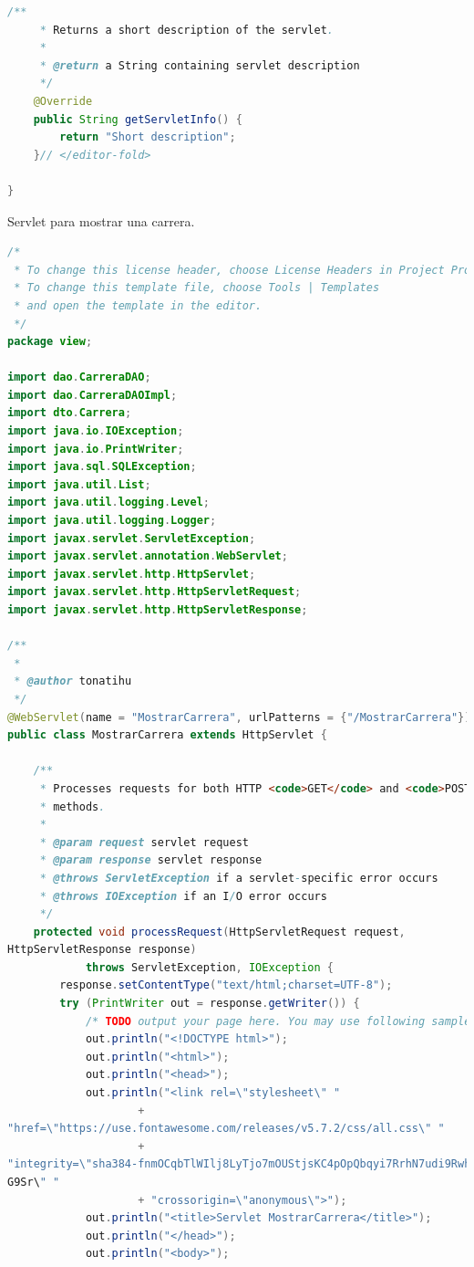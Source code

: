 \documentclass[a4paper,12pt]{article}
\begin{document}
\begin{lstlisting}[language=Java, style=customJava, 
caption={VerCarrera.java},captionpos=b,basicstyle=\fontfamily{cmss}\small]
    /**
     * Returns a short description of the servlet.
     *
     * @return a String containing servlet description
     */
    @Override
    public String getServletInfo() {
        return "Short description";
    }// </editor-fold>

}

\end{lstlisting}

Servlet para mostrar una carrera.

\begin{lstlisting}[language=Java, style=customJava, 
caption={MostrarCarrera.java},captionpos=b,basicstyle=\fontfamily{cmss}\small]
/*
 * To change this license header, choose License Headers in Project Properties.
 * To change this template file, choose Tools | Templates
 * and open the template in the editor.
 */
package view;

import dao.CarreraDAO;
import dao.CarreraDAOImpl;
import dto.Carrera;
import java.io.IOException;
import java.io.PrintWriter;
import java.sql.SQLException;
import java.util.List;
import java.util.logging.Level;
import java.util.logging.Logger;
import javax.servlet.ServletException;
import javax.servlet.annotation.WebServlet;
import javax.servlet.http.HttpServlet;
import javax.servlet.http.HttpServletRequest;
import javax.servlet.http.HttpServletResponse;

/**
 *
 * @author tonatihu
 */
@WebServlet(name = "MostrarCarrera", urlPatterns = {"/MostrarCarrera"})
public class MostrarCarrera extends HttpServlet {

    /**
     * Processes requests for both HTTP <code>GET</code> and <code>POST</code>
     * methods.
     *
     * @param request servlet request
     * @param response servlet response
     * @throws ServletException if a servlet-specific error occurs
     * @throws IOException if an I/O error occurs
     */
    protected void processRequest(HttpServletRequest request, 
HttpServletResponse response)
            throws ServletException, IOException {
        response.setContentType("text/html;charset=UTF-8");
        try (PrintWriter out = response.getWriter()) {
            /* TODO output your page here. You may use following sample code. */
            out.println("<!DOCTYPE html>");
            out.println("<html>");
            out.println("<head>");
            out.println("<link rel=\"stylesheet\" "
                    + 
"href=\"https://use.fontawesome.com/releases/v5.7.2/css/all.css\" "
                    + 
"integrity=\"sha384-fnmOCqbTlWIlj8LyTjo7mOUStjsKC4pOpQbqyi7RrhN7udi9RwhKkMHpvLbH
G9Sr\" "
                    + "crossorigin=\"anonymous\">");
            out.println("<title>Servlet MostrarCarrera</title>");
            out.println("</head>");
            out.println("<body>");


\end{lstlisting}
\end{document}
